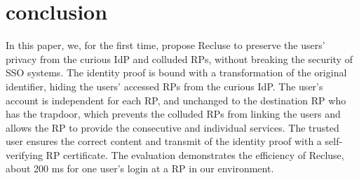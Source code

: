 \section{conclusion}
\label{sec:conclusion}
In this paper, we, for the first time, propose Recluse to preserve the users' privacy from the curious IdP and colluded RPs,  without breaking the security of SSO systems. The identity proof is bound with a transformation of the original identifier, hiding the users' accessed RPs from the curious IdP. The user's account is independent for each RP, and unchanged to the destination RP who has the trapdoor, which prevents the colluded RPs from linking the users and allows the RP to provide the consecutive and individual services. The trusted user ensures the correct content and transmit of the identity proof with a self-verifying RP certificate. The evaluation demonstrates the efficiency of Recluse, about 200 ms for one user's login at a RP in our environment.
